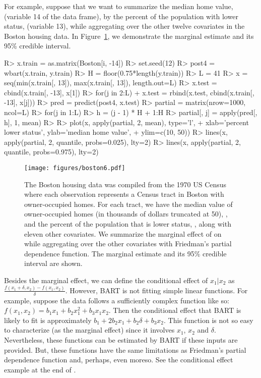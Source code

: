 \documentclass[article]{jss}
\begin{document}
For example, suppose that we want to summarize the median home value,
 (variable 14 of the  data frame), by the
percent of the population with lower status,  (variable
13), while aggregating over the other twelve covariates in the Boston
housing data.  In Figure~\ref{boston6}, we demonstrate the marginal
estimate and its 95\% credible interval.
\begin{Sinput}
R> x.train = as.matrix(Boston[i, -14])
R> set.seed(12) 
R> post4 = wbart(x.train, y.train)
R> H = floor(0.75*length(y.train))
R> L = 41
R> x = seq(min(x.train[, 13]), max(x.train[, 13]), length.out=L)
R> x.test = cbind(x.train[, -13], x[1])
R> for(j in 2:L)
+    x.test = rbind(x.test, cbind(x.train[, -13], x[j]))
R> pred = predict(post4, x.test)
R> partial = matrix(nrow=1000, ncol=L)
R> for(j in 1:L) {
R>   h = (j - 1) * H + 1:H
R>   partial[, j] = apply(pred[, h], 1, mean)
R> }
R> plot(x, apply(partial, 2, mean), type='l',
+    xlab='percent lower status', ylab='median home value',
+    ylim=c(10, 50))
R> lines(x, apply(partial, 2, quantile, probs=0.025), lty=2)
R> lines(x, apply(partial, 2, quantile, probs=0.975), lty=2)
\end{Sinput}
\begin{figure}
\begin{center}
\texttt{[image: figures/boston6.pdf]}
\end{center}
\caption{\label{boston6}The Boston housing data was compiled from the
  1970 US Census where each observation represents a Census tract in
  Boston with owner-occupied homes. For each tract, we have the median
  value of owner-occupied homes (in thousands of dollars truncated at
  50), , and the percent of the population that is lower
  status, , along with eleven other covariates.  We
  summarize the marginal effect of  on  while
  aggregating over the other covariates with Friedman's partial
  dependence function.  The marginal estimate and its 95\% credible
  interval are shown. }
\end{figure}
Besides the marginal effect, we can 
define the conditional effect of $x_1|x_2$ as
  $\frac{f(x_1+\delta, {x}_2)-f(x_1, {x}_2)}{\delta}$.  However,
  BART is not fitting simple linear functions.  For example, suppose
  the data follows a sufficiently complex function like so:
  $f(x_1, x_2)=b_1 x_1 + b_2 x_1^2 + b_3 x_1 x_2$.  Then the
  conditional effect that BART is likely to fit is approximately
  $b_1 + 2 b_2 x_1 + b_2\delta+ b_3 {x}_2$.  This function is not
so easy to characterize (as the marginal effect) since it involves
$x_1$, $x_2$ and $\delta$.  Nevertheless, these functions can be
estimated by BART if these inputs are provided.  But, these 
functions have the same limitations as Friedman's partial dependence
function and, perhaps, even moreso.  See the conditional effect
example at the end of .
\end{document}
